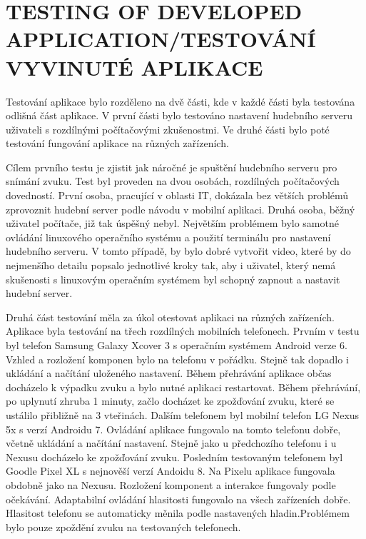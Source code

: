 \documentclass[journal, a4paper]{IEEEtran}
\begin{document}
\section{TESTING OF DEVELOPED APPLICATION/TESTOVÁNÍ VYVINUTÉ APLIKACE}
Testování aplikace bylo rozděleno na dvě části, kde v každé části byla testována odlišná část aplikace. V první části bylo testováno nastavení hudebního serveru uživateli s rozdílnými počítačovými zkušenostmi. Ve druhé části bylo poté testování fungování aplikace na různých zařízeních. \par
Cílem prvního testu je zjistit jak náročné je spuštění hudebního serveru pro snímání zvuku. Test byl proveden na dvou osobách, rozdílných počítačových dovedností. První osoba, pracující v oblasti IT, dokázala bez větších problémů zprovoznit hudební server podle návodu v mobilní aplikaci. Druhá osoba, běžný uživatel počítače, již tak úspěšný nebyl. Největším problémem bylo samotné ovládání linuxového operačního systému a použití terminálu pro nastavení hudebního serveru. V tomto případě, by bylo dobré vytvořit video, které by do nejmenšího detailu popsalo jednotlivé kroky tak, aby i uživatel, který nemá skušenosti s linuxovým operačním systémem byl schopný zapnout a nastavit hudební server.\par 
Druhá část testování měla za úkol otestovat aplikaci na různých zařízeních. Aplikace byla testování na třech rozdílných mobilních telefonech. Prvním v testu byl telefon Samsung Galaxy Xcover 3 s operačním systémem Android verze 6. Vzhled a rozložení komponen bylo na telefonu v pořádku. Stejně tak dopadlo i ukládání a načítání uloženého nastavení. Během přehrávání aplikace občas docházelo k výpadku zvuku a bylo nutné aplikaci restartovat. Během přehrávání, po uplynutí zhruba 1 minuty, začlo docházet  ke zpožďování zvuku, které se ustálilo přibližně na 3 vteřinách. Dalším telefonem byl mobilní telefon LG Nexus 5x s verzí Androidu 7. Ovládání aplikace fungovalo na tomto telefonu dobře, včetně ukládání a načítání nastavení. Stejně jako u předchozího telefonu i u Nexusu docházelo ke zpožďování zvuku. Posledním testovaným telefonem byl Goodle Pixel XL s nejnověší verzí Andoidu 8. Na Pixelu aplikace fungovala obdobně jako na Nexusu. Rozložení komponent a interakce fungovaly podle očekávání. Adaptabilní ovládání hlasitosti fungovalo na všech zařízeních dobře. Hlasitost telefonu se automaticky měnila podle nastavených hladin.Problémem bylo pouze zpoždění zvuku na testovaných telefonech.

\end{document}
